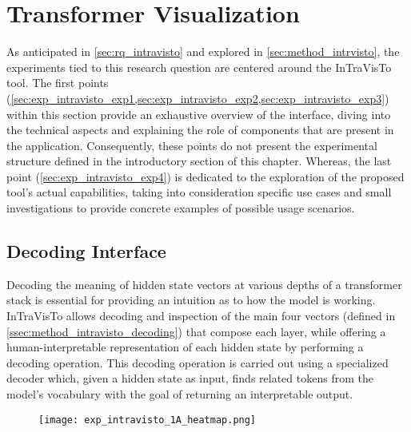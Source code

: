 \section{Transformer Visualization}\label{sec:exp_intravisto}

As anticipated in \cref{sec:rq_intravisto} and explored in \cref{sec:method_intrvisto}, the experiments tied to this research question are centered around the InTraVisTo tool.
The first points (\cref{sec:exp_intravisto_exp1,sec:exp_intravisto_exp2,sec:exp_intravisto_exp3}) within this section provide an exhaustive overview of the interface, diving into the technical aspects and explaining the role of components that are present in the application.
Consequently, these points do not present the experimental structure defined in the introductory section of this chapter.
Whereas, the last point (\cref{sec:exp_intravisto_exp4}) is dedicated to the exploration of the proposed tool's actual capabilities, taking into consideration specific use cases and small investigations to provide concrete examples of possible usage scenarios.

\subsection{Decoding Interface}\label{sec:exp_intravisto_exp1}

Decoding the meaning of hidden state vectors at various depths of a transformer stack is essential for providing an intuition as to how the model is working.
InTraVisTo allows decoding and inspection of the main four vectors (defined in \cref{ssec:method_intravisto_decoding}) that compose each layer, while offering a human-interpretable representation of each hidden state by performing a decoding operation.
This decoding operation is carried out using a specialized decoder which, given a hidden state as input, finds related tokens from the model's vocabulary with the goal of returning an interpretable output.

\begin{figure}[t!]
    \centering
    \texttt{[image: exp\_intravisto\_1A\_heatmap.png]}
    \caption{}
    \label{fig:exp_intravisto_1_A}
\end{figure}


